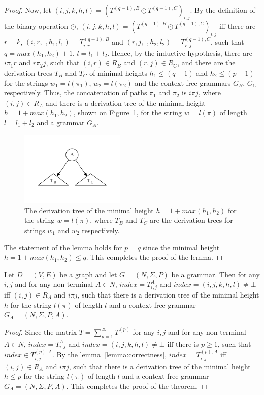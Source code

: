 \begin{proof}
	Now, let $(i,j,k,h,l) = (T^{(q-1),B} \odot T^{(q-1),C})_{i,j}$. By the definition of the binary operation $\odot$, $(i,j,k,h,l) = (T^{(q-1),B} \odot T^{(q-1),C})_{i,j}$ iff there are $r=k$, $(i,r,\_,h_1,l_1) = T^{(q-1),B}_{i,r}$ and $(r,j,\_,h_2,l_2) = T^{(q-1),C}_{r,j}$, such that $q = max(h_1, h_2) + 1$, $l = l_1 + l_2$. Hence, by the inductive hypothesis, there are $i \pi_1 r$ and $r \pi_2 j$, such that $(i,r) \in R_B$ and $(r,j) \in R_C$, and there are the derivation trees $T_B$ and $T_C$ of minimal heights $h_1 \leq (q-1)$ and $h_2 \leq (p-1)$ for the strings $w_1 = l(\pi_1)$, $w_2 = l(\pi_2)$ and the context-free grammars $G_B$, $G_C$ respectively. Thus, the concatenation of paths $\pi_1$ and $\pi_2$ is $i \pi j$, where $(i,j) \in R_A$ and there is a derivation tree of the minimal height $h = 1 + max(h_1, h_2)$, shown on Figure~\ref{tree2}, for the string $w = l(\pi)$ of length $l = l_1 + l_2$ and a grammar $G_A$.
	\begin{figure}[h!]
		\centering
		\includegraphics[width=5cm]{pictures/tree2.pdf}
		\caption{The derivation tree of the minimal height $h = 1 + max(h_1, h_2)$ for the string $w = l(\pi)$, where $T_B$ and $T_C$ are the derivation trees for strings $w_1$ and $w_2$ respectively.}
		\label{tree2}
	\end{figure}
	
	The statement of the lemma holds for $p = q$ since the minimal height $h = 1 + max(h_1, h_2) \leq q$. This completes the proof of the lemma.
\end{proof}

\begin{mytheorem}\label{thm:correct}
	Let $D = (V,E)$ be a graph and let $G =(N,\Sigma,P)$ be a grammar. Then for any $i, j$ and for any non-terminal $A \in N$, $index = T^A_{i,j}$ and $index = (i,j,k,h,l) \neq \bot$ iff $(i,j) \in R_A$ and $i \pi j$, such that there is a derivation tree of the minimal height $h$ for the string $l(\pi)$ of length $l$ and a context-free grammar $G_A = (N,\Sigma,P,A)$.
\end{mytheorem}
\begin{proof}
	
	Since the matrix $T = \sum_{p = 1}^{\infty} T^{(p)}$ for any $i, j$ and for any non-terminal $A \in N$, $index = T^A_{i,j}$ and $index = (i,j,k,h,l) \neq \bot$ iff there is $p \geq 1$, such that $index \in T^{(p),A}_{i,j}$. By the lemma~\ref{lemma:correctness}, $index = T^{(p),A}_{i,j}$ iff $(i,j) \in R_A$ and $i \pi j$, such that there is a derivation tree of the minimal height $h \leq p$ for the string $l(\pi)$  of length $l$ and a context-free grammar $G_A = (N,\Sigma,P,A)$. This completes the proof of the theorem.
\end{proof}

